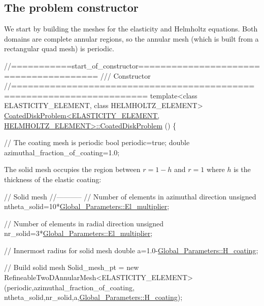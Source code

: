  

\hypertarget{index_constr}{}\subsection{The problem constructor}\label{index_constr}
We start by building the meshes for the elasticity and Helmholtz equations. Both domains are complete annular regions, so the annular mesh (which is built from a rectangular quad mesh) is periodic.

 
\begin{DoxyCodeInclude}
\textcolor{comment}{//===========start\_of\_constructor======================================= }
\textcolor{comment}{/// Constructor}
\textcolor{comment}{}\textcolor{comment}{//====================================================================== }
\textcolor{keyword}{template}<\textcolor{keyword}{class} ELASTICITY\_ELEMENT, \textcolor{keyword}{class} HELMHOLTZ\_ELEMENT>
\hyperlink{classCoatedDiskProblem_a9585ca5b422c72dc2b91cbb3e311b736}{CoatedDiskProblem<ELASTICITY\_ELEMENT, HELMHOLTZ\_ELEMENT>::CoatedDiskProblem}
      () 
\{

 \textcolor{comment}{// The coating mesh is periodic}
 \textcolor{keywordtype}{bool} periodic=\textcolor{keyword}{true};
 \textcolor{keywordtype}{double} azimuthal\_fraction\_of\_coating=1.0;

\end{DoxyCodeInclude}


The solid mesh occupies the region between $ r = 1-h $ and $ r=1 $ where $ h $ is the thickness of the elastic coating\+:


\begin{DoxyCodeInclude}
 
 \textcolor{comment}{// Solid mesh}
 \textcolor{comment}{//-----------}
 \textcolor{comment}{// Number of elements in azimuthal direction}
 \textcolor{keywordtype}{unsigned} ntheta\_solid=10*\hyperlink{namespaceGlobal__Parameters_a35d5d2ecfff0cec6150a5dc79e5c1ad1}{Global\_Parameters::El\_multiplier};

 \textcolor{comment}{// Number of elements in radial direction }
 \textcolor{keywordtype}{unsigned} nr\_solid=3*\hyperlink{namespaceGlobal__Parameters_a35d5d2ecfff0cec6150a5dc79e5c1ad1}{Global\_Parameters::El\_multiplier};

 \textcolor{comment}{// Innermost radius for solid mesh}
 \textcolor{keywordtype}{double} a=1.0-\hyperlink{namespaceGlobal__Parameters_ae3cf8878ede839bffda01f79bbe3e819}{Global\_Parameters::H\_coating};
 
 \textcolor{comment}{// Build solid mesh}
 Solid\_mesh\_pt = \textcolor{keyword}{new} 
  RefineableTwoDAnnularMesh<ELASTICITY\_ELEMENT>
  (periodic,azimuthal\_fraction\_of\_coating,
   ntheta\_solid,nr\_solid,a,\hyperlink{namespaceGlobal__Parameters_ae3cf8878ede839bffda01f79bbe3e819}{Global\_Parameters::H\_coating});

\end{DoxyCodeInclude}


